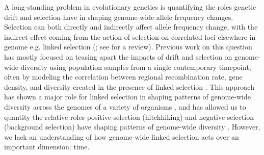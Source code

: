 \documentclass[11pt]{article}
\begin{document}
A long-standing problem in evolutionary genetics is quantifying the roles
genetic drift and selection have in shaping genome-wide allele frequency
changes. Selection can both directly and indirectly affect allele frequency
change, with the indirect effect coming from the action of selection on
correlated loci elsewhere in genome e.g. linked selection
(\cite{Maynard_Smith1974-lc,Charlesworth1993-gb,Nordborg1996-nq}; see
\cite{Barton2000-zg} for a review).  Previous work on this question has mostly
focused on teasing apart the impacts of drift and selection on genome-wide
diversity using population samples from a single contemporary timepoint, often
by modeling the correlation between regional recombination rate, gene density,
and diversity created in the presence of linked selection
\parencite{Begun1992-ey,Elyashiv2016-vt}. This approach has shown a major role
for linked selection in shaping patterns of genome-wide diversity across the
genomes of a variety of organisms
\parencite{Begun2007-bg,Beissinger2016-cm,Sattath2011-dr,Williamson2014-oy,Andersen2012-bj,Cutter2010-gi},
and has allowed us to quantity the relative roles positive selection
(hitchhiking) and negative selection (background selection) have shaping
patterns of genome-wide diversity
\parencite{Nordborg2005-dc,McVicker2009-ax,Hernandez2011-gs,Elyashiv2016-vt}.
However, we lack an understanding of how genome-wide linked selection acts over
an important dimension: time.
\end{document}
